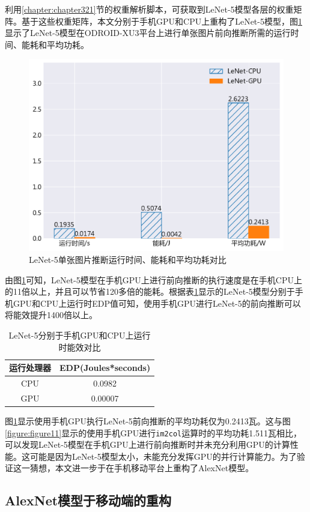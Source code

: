 利用\ref{chapter:chapter321}节的权重解析脚本，可获取到LeNet-5模型各层的权重矩阵。基于这些权重矩阵，本文分别于手机GPU和CPU上重构了LeNet-5模型，图\ref{figure:figure16}显示了LeNet-5模型在ODROID-XU3平台上进行单张图片前向推断所需的运行时间、能耗和平均功耗。

\begin{figure}[htbp]
    \centering
    \includegraphics[height=0.4\textwidth]{figures/lenet_energy.pdf}
    \caption{LeNet-5单张图片推断运行时间、能耗和平均功耗对比}\label{figure:figure16}
\end{figure}

由图\ref{figure:figure16}可知，LeNet-5模型在手机GPU上进行前向推断的执行速度是在手机CPU上的11倍以上，并且可以节省120多倍的能耗。根据表\ref{table:table6}显示的LeNet-5模型分别于手机GPU和CPU上运行时EDP值可知，使用手机GPU进行LeNet-5的前向推断可以将能效提升1400倍以上。

\begin{table}[htbp]
  \centering
  \caption{LeNet-5分别于手机GPU和CPU上运行时能效对比}
  \label{table:table6}
  \begin{tabular}{cc}
    \toprule
      运行处理器 & EDP(Joules*seconds) \\
    \midrule
      CPU & 0.0982 \\
      GPU & 0.00007 \\
    \bottomrule
  \end{tabular}
\end{table}

图\ref{figure:figure16}显示使用手机GPU执行LeNet-5前向推断的平均功耗仅为0.2413瓦。这与图\ref{figure:figure11}显示的使用手机GPU进行\texttt{im2col}运算时的平均功耗1.511瓦相比，可以发现LeNet-5模型在手机GPU上进行前向推断时并未充分利用GPU的计算性能。这可能是因为LeNet-5模型太小，未能充分发挥GPU的并行计算能力。为了验证这一猜想，本文进一步于在手机移动平台上重构了AlexNet模型。

\subsection{AlexNet模型于移动端的重构}

